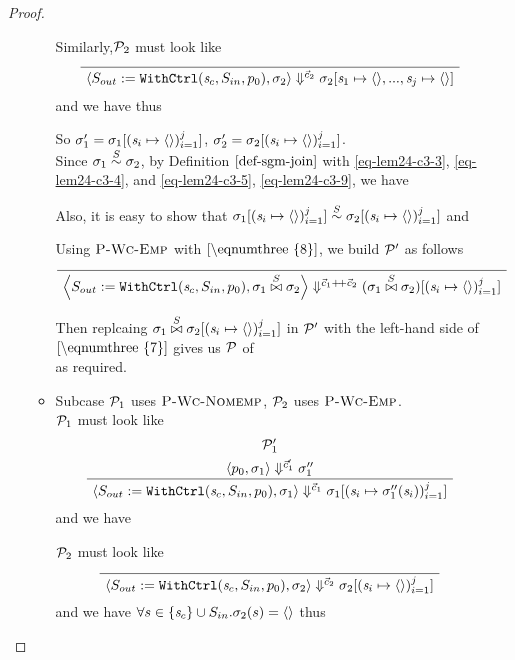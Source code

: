 \begin{proof}
\begin{itemize}
\begin{itemize}
    	Similarly,$\mathcal{P}_2$ must look like  	
    	$$\PT{
    		\Axiom{\seval{\casethree}{\sgm_2}{\c_2}{\sgm_2[\s_1 \|-> \emptyv, ..., \s_j \|-> \emptyv]}}
    	}$$
    	and we have   
    	thus

 \def\sgmbe#1{\sgm_#1[\j{\s_i \|-> \emptyv}]}
    	
    	So $\sgm_1' = \sgmbe{1}$, $\sgm_2' = \sgmbe{2}$. \\
    	
 	Since $\sigma_1 \stackrel{S}{\sim} \sigma_2$, by Definition $\ref{def-sgm-join}$ with \eqref{eq-lem24-c3-3}, \eqref{eq-lem24-c3-4}, and  \eqref{eq-lem24-c3-5}, \eqref{eq-lem24-c3-9}, we have    		
   		
   		Also, it is easy to show that $\sgmbe1 \~{\S} \sgmbe2$ and 
   		\eq{\eqnumthree{7}}{
   			\sgmbe1 \x{\S} \sgmbe2 = \sgmx[\j{\s_i \|-> \emptyv}]
   		}
   	
    Using $\textsc{P-Wc-Emp}$ with $\eqref{\eqnumthree{8}}$, we build $\mathcal{P}'$ as follows
   		$$\PT{
   			\Axiom{\seval{\casethree}{\sgmx}{\cc}{(\sgmx)[\j{\s_i \|-> \emptyv}]}}
   		}$$
   	
   	Then replcaing $\sgmx[\j{\s_i \|-> \emptyv}]$ in $\mathcal{P}'$ with the left-hand side of $\eqref{\eqnumthree{7}}$ gives us $\mathcal{P}$ of \\
   \makebox[0.9\textwidth][c]{		$$\PT{
   			\Axiom{\seval{\casethree}{\sgmx}{\cc}{\sgmbe1 \x{\S} \sgmbe2}}
   		}$$}
   		as required. \\
   
   	\item Subcase $\mathcal{P}_1$ uses  $\textsc{P-Wc-Nomemp}$, $\mathcal{P}_2$ uses $\textsc{P-Wc-Emp}$. \\
  \def\sgmbpp#1{\sgm_{#1}[\j{\s_i \|-> \sgm_{#1}''(\s_i)}]}   	
   	$\mathcal{P}_1$ must look like
   	$$\PT{
   			\UCN{\MP_1'}{\seval{p_0}{\sgm_1}{\c_1'}{\sgm_1''}}
   			\UC{\seval{\casethree}{\sgm_1}{\c_1}{\sgmbpp1}}
   	}$$
    and we have 
   	
   	$\mathcal{P}_2$ must look like	
   	$$\PT{
   		\Axiom{\seval{\casethree}{\sgm_2}{\c_2}{\sgmbe{2}}}
   	}$$
   	and we have  
   	$\forall s \in \{\mathit{s}_c\} \cup S_{in}. \sigma_2(s) = \langle \rangle$
   thus
 



\end{itemize}
\end{itemize}
\end{proof}
